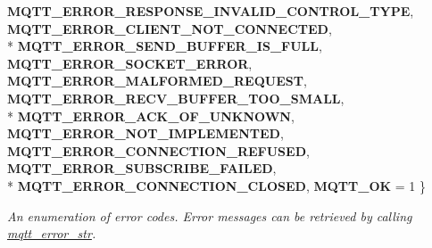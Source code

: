 \begin{DoxyCompactItemize}
{\bfseries M\+Q\+T\+T\+\_\+\+E\+R\+R\+O\+R\+\_\+\+R\+E\+S\+P\+O\+N\+S\+E\+\_\+\+I\+N\+V\+A\+L\+I\+D\+\_\+\+C\+O\+N\+T\+R\+O\+L\+\_\+\+T\+Y\+PE}, 
{\bfseries M\+Q\+T\+T\+\_\+\+E\+R\+R\+O\+R\+\_\+\+C\+L\+I\+E\+N\+T\+\_\+\+N\+O\+T\+\_\+\+C\+O\+N\+N\+E\+C\+T\+ED}, 
\\*
{\bfseries M\+Q\+T\+T\+\_\+\+E\+R\+R\+O\+R\+\_\+\+S\+E\+N\+D\+\_\+\+B\+U\+F\+F\+E\+R\+\_\+\+I\+S\+\_\+\+F\+U\+LL}, 
{\bfseries M\+Q\+T\+T\+\_\+\+E\+R\+R\+O\+R\+\_\+\+S\+O\+C\+K\+E\+T\+\_\+\+E\+R\+R\+OR}, 
{\bfseries M\+Q\+T\+T\+\_\+\+E\+R\+R\+O\+R\+\_\+\+M\+A\+L\+F\+O\+R\+M\+E\+D\+\_\+\+R\+E\+Q\+U\+E\+ST}, 
{\bfseries M\+Q\+T\+T\+\_\+\+E\+R\+R\+O\+R\+\_\+\+R\+E\+C\+V\+\_\+\+B\+U\+F\+F\+E\+R\+\_\+\+T\+O\+O\+\_\+\+S\+M\+A\+LL}, 
\\*
{\bfseries M\+Q\+T\+T\+\_\+\+E\+R\+R\+O\+R\+\_\+\+A\+C\+K\+\_\+\+O\+F\+\_\+\+U\+N\+K\+N\+O\+WN}, 
{\bfseries M\+Q\+T\+T\+\_\+\+E\+R\+R\+O\+R\+\_\+\+N\+O\+T\+\_\+\+I\+M\+P\+L\+E\+M\+E\+N\+T\+ED}, 
{\bfseries M\+Q\+T\+T\+\_\+\+E\+R\+R\+O\+R\+\_\+\+C\+O\+N\+N\+E\+C\+T\+I\+O\+N\+\_\+\+R\+E\+F\+U\+S\+ED}, 
{\bfseries M\+Q\+T\+T\+\_\+\+E\+R\+R\+O\+R\+\_\+\+S\+U\+B\+S\+C\+R\+I\+B\+E\+\_\+\+F\+A\+I\+L\+ED}, 
\\*
{\bfseries M\+Q\+T\+T\+\_\+\+E\+R\+R\+O\+R\+\_\+\+C\+O\+N\+N\+E\+C\+T\+I\+O\+N\+\_\+\+C\+L\+O\+S\+ED}, 
{\bfseries M\+Q\+T\+T\+\_\+\+OK} = 1
 \}\begin{DoxyCompactList}\small\item\em An enumeration of error codes. Error messages can be retrieved by calling \hyperlink{group__api_ga47b62bdd24e8b05957825d2419d7c848}{mqtt\+\_\+error\+\_\+str}. \end{DoxyCompactList}
\end{DoxyCompactItemize}
